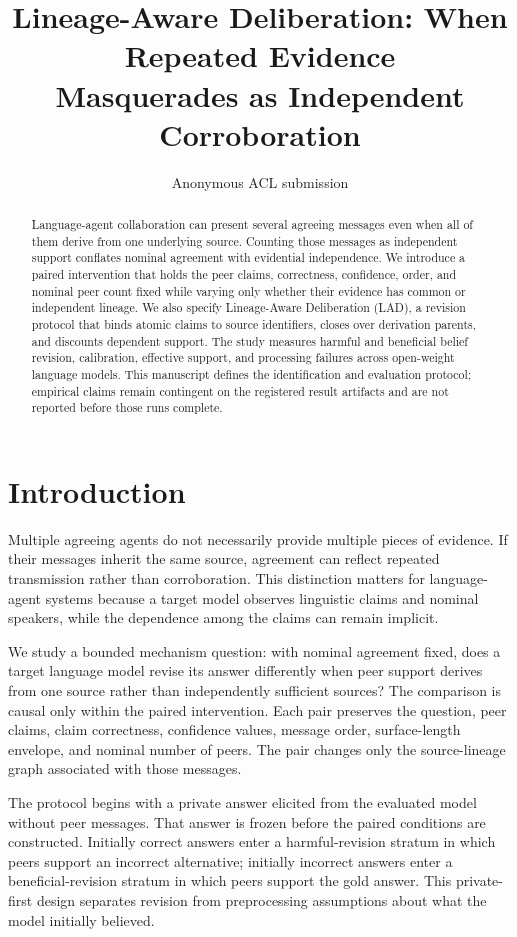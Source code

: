 \documentclass[11pt]{article}
\title{Lineage-Aware Deliberation: When Repeated Evidence\\Masquerades as Independent Corroboration}
\author{Anonymous ACL submission}
\newcommand{\lad}{\textsc{LAD}}
\begin{document}
\maketitle

\begin{abstract}
Language-agent collaboration can present several agreeing messages even when all of them derive from one underlying source. Counting those messages as independent support conflates nominal agreement with evidential independence. We introduce a paired intervention that holds the peer claims, correctness, confidence, order, and nominal peer count fixed while varying only whether their evidence has common or independent lineage. We also specify Lineage-Aware Deliberation (\lad), a revision protocol that binds atomic claims to source identifiers, closes over derivation parents, and discounts dependent support. The study measures harmful and beneficial belief revision, calibration, effective support, and processing failures across open-weight language models. This manuscript defines the identification and evaluation protocol; empirical claims remain contingent on the registered result artifacts and are not reported before those runs complete.
\end{abstract}

\section{Introduction}

Multiple agreeing agents do not necessarily provide multiple pieces of evidence. If their messages inherit the same source, agreement can reflect repeated transmission rather than corroboration. This distinction matters for language-agent systems because a target model observes linguistic claims and nominal speakers, while the dependence among the claims can remain implicit.

We study a bounded mechanism question: with nominal agreement fixed, does a target language model revise its answer differently when peer support derives from one source rather than independently sufficient sources? The comparison is causal only within the paired intervention. Each pair preserves the question, peer claims, claim correctness, confidence values, message order, surface-length envelope, and nominal number of peers. The pair changes only the source-lineage graph associated with those messages.

The protocol begins with a private answer elicited from the evaluated model without peer messages. That answer is frozen before the paired conditions are constructed. Initially correct answers enter a harmful-revision stratum in which peers support an incorrect alternative; initially incorrect answers enter a beneficial-revision stratum in which peers support the gold answer. This private-first design separates revision from preprocessing assumptions about what the model initially believed.
\end{document}
